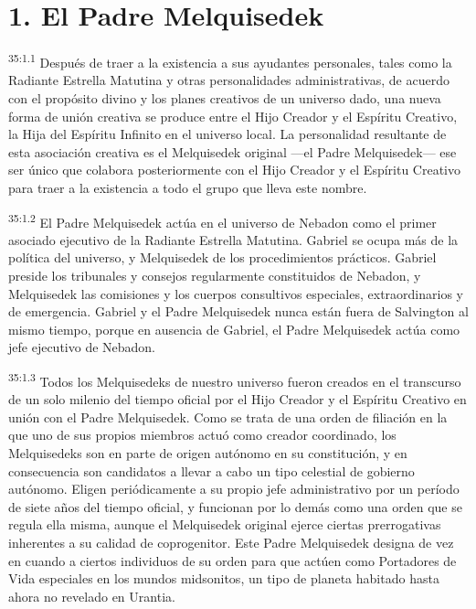 \section*{1. El Padre Melquisedek}
\par
\textsuperscript{35:1.1} Después de traer a la existencia a sus ayudantes personales, tales como la Radiante Estrella Matutina y otras personalidades administrativas, de acuerdo con el propósito divino y los planes creativos de un universo dado, una nueva forma de unión creativa se produce entre el Hijo Creador y el Espíritu Creativo, la Hija del Espíritu Infinito en el universo local. La personalidad resultante de esta asociación creativa es el Melquisedek original ---el Padre Melquisedek--- ese ser único que colabora posteriormente con el Hijo Creador y el Espíritu Creativo para traer a la existencia a todo el grupo que lleva este nombre.

\par
\textsuperscript{35:1.2} El Padre Melquisedek actúa en el universo de Nebadon como el primer asociado ejecutivo de la Radiante Estrella Matutina. Gabriel se ocupa más de la política del universo, y Melquisedek de los procedimientos prácticos. Gabriel preside los tribunales y consejos regularmente constituidos de Nebadon, y Melquisedek las comisiones y los cuerpos consultivos especiales, extraordinarios y de emergencia. Gabriel y el Padre Melquisedek nunca están fuera de Salvington al mismo tiempo, porque en ausencia de Gabriel, el Padre Melquisedek actúa como jefe ejecutivo de Nebadon.

\par
\textsuperscript{35:1.3} Todos los Melquisedeks de nuestro universo fueron creados en el transcurso de un solo milenio del tiempo oficial por el Hijo Creador y el Espíritu Creativo en unión con el Padre Melquisedek. Como se trata de una orden de filiación en la que uno de sus propios miembros actuó como creador coordinado, los Melquisedeks son en parte de origen autónomo en su constitución, y en consecuencia son candidatos a llevar a cabo un tipo celestial de gobierno autónomo. Eligen periódicamente a su propio jefe administrativo por un período de siete años del tiempo oficial, y funcionan por lo demás como una orden que se regula ella misma, aunque el Melquisedek original ejerce ciertas prerrogativas inherentes a su calidad de coprogenitor. Este Padre Melquisedek designa de vez en cuando a ciertos individuos de su orden para que actúen como Portadores de Vida especiales en los mundos midsonitos, un tipo de planeta habitado hasta ahora no revelado en Urantia.

